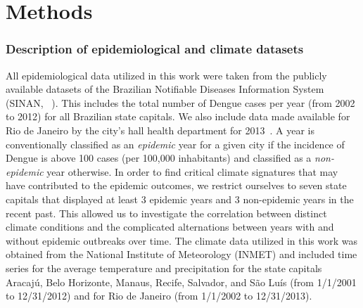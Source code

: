 \documentclass[final,leqno]{siamltexmm2}
\begin{document}
\section*{Methods}
%
%
%
\subsubsection*{Description of epidemiological and climate datasets}

All epidemiological data utilized in this work were taken from the publicly available 
datasets of the Brazilian Notifiable Diseases Information System (SINAN, ~\cite{SINAN}). 
This includes the total number of Dengue cases per year (from 2002 to 2012) for all Brazilian 
state capitals. We also include data made available for Rio de Janeiro by the city's hall health 
department for 2013~\cite{Riodengue}. A year is conventionally classified as an \emph{epidemic} year 
for a given city if the incidence of Dengue is above 100 cases (per 100,000 inhabitants) and 
classified as a \emph{non-epidemic} year otherwise. In order to find critical climate signatures that may 
have contributed to the epidemic outcomes, we restrict ourselves to seven state capitals that 
displayed at least 3 epidemic years and 3 non-epidemic years in the recent past. This allowed 
us to investigate the correlation between distinct climate conditions and the complicated alternations 
between years with and without epidemic outbreaks over time. The climate data utilized in this 
work was obtained from the National Institute of Meteorology (INMET)  and included 
time series for the average temperature and precipitation for the state capitals Aracajú, Belo 
Horizonte, Manaus, Recife, Salvador, and São Luís (from 1/1/2001 to 12/31/2012) and for 
Rio de Janeiro (from 1/1/2002 to 12/31/2013). 
\end{document}
